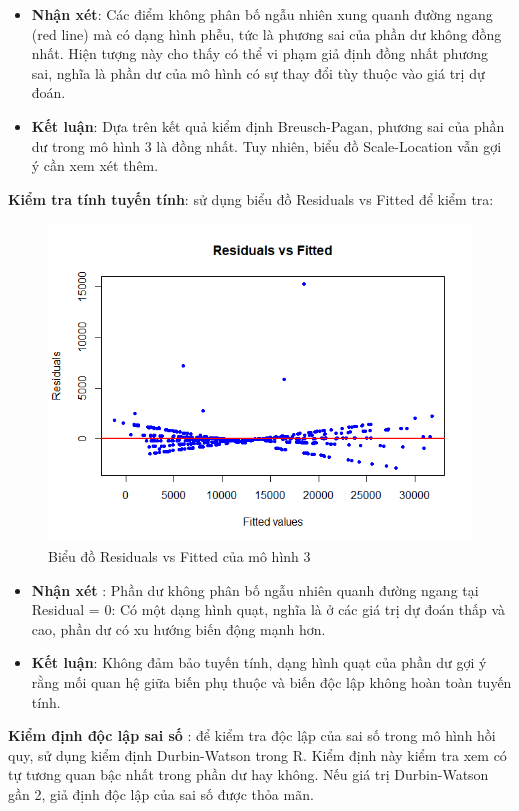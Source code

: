 \begin{itemize}
  \item\textbf{Nhận xét}: Các điểm không phân bố ngẫu nhiên xung quanh đường ngang (red line) mà có dạng hình phễu, tức là phương sai của phần dư không đồng nhất. Hiện tượng này cho thấy có thể vi phạm giả định đồng nhất phương sai, nghĩa là phần dư của mô hình có sự thay đổi tùy thuộc vào giá trị dự đoán.
  \item\textbf{Kết luận}: Dựa trên kết quả kiểm định Breusch-Pagan, phương sai của phần dư trong mô hình 3 là đồng nhất.
  Tuy nhiên, biểu đồ Scale-Location vẫn gợi ý cần xem xét thêm.
\end{itemize}

\textbf{Kiểm tra tính tuyến tính}: sử dụng biểu đồ Residuals vs Fitted để kiểm tra:

\begin{figure}[H]
  \centering
  \includegraphics[width=0.7\linewidth]{graphics/5.5.12.png}
  \caption{Biểu đồ Residuals vs Fitted của mô hình 3 }
\end{figure}
\begin{itemize}
\item\textbf{Nhận xét }: Phần dư không phân bố ngẫu nhiên quanh đường ngang tại Residual = 0: Có một dạng hình quạt, nghĩa là ở các giá trị dự đoán thấp và cao, phần dư có xu hướng biến động mạnh hơn.
\item\textbf{Kết luận}: Không đảm bảo tuyến tính, dạng hình quạt của phần dư gợi ý rằng mối quan hệ giữa biến phụ thuộc và biến độc lập không hoàn toàn tuyến tính.
\end{itemize}


\textbf{Kiểm định độc lập sai số} : để kiểm tra độc lập của sai số trong mô hình hồi quy, sử dụng kiểm định Durbin-Watson trong R. Kiểm định này kiểm tra xem có tự tương quan bậc nhất trong phần dư hay không. Nếu giá trị Durbin-Watson gần 2, giả định độc lập của sai số được thỏa mãn.

